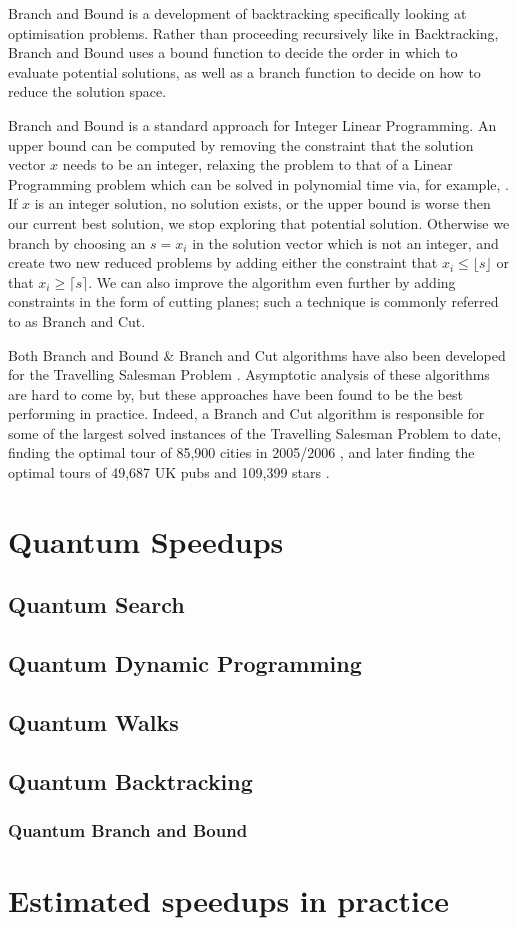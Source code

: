 Branch and Bound is a development of backtracking specifically looking at optimisation problems. Rather than proceeding recursively like in Backtracking, Branch and Bound uses a bound function to decide the order in which to evaluate potential solutions, as well as a branch function to decide on how to reduce the solution space.

Branch and Bound is a standard approach for Integer Linear Programming. An upper bound can be computed by removing the constraint that the solution vector $x$ needs to be an integer, relaxing the problem to that of a Linear Programming problem which can be solved in polynomial time via, for example, \cite{cohen2019}. If $x$ is an integer solution, no solution exists, or the upper bound is worse then our current best solution, we stop exploring that potential solution. Otherwise we branch by choosing an $s = x_i$ in the solution vector which is not an integer, and create two new reduced problems by adding either the constraint that $x_i \leq \lfloor s \rfloor$ or that $x_i \geq \lceil s \rceil$. We can also improve the algorithm even further by adding constraints in the form of cutting planes; such a technique is commonly referred to as Branch and Cut.

Both Branch and Bound \& Branch and Cut algorithms have also been developed for the Travelling Salesman Problem \cite{little1963, padberg1991}. Asymptotic analysis of these algorithms are hard to come by, but these approaches have been found to be the best performing in practice. Indeed, a Branch and Cut algorithm is responsible for some of the largest solved instances of the Travelling Salesman Problem to date, finding the optimal tour of 85,900 cities in 2005/2006 \cite{applegate2006}, and later finding the optimal tours of 49,687 UK pubs and 109,399 stars \cite{tspuk49687}.

\section{Quantum Speedups}

\subsection{Quantum Search}

\subsection{Quantum Dynamic Programming}

\subsection{Quantum Walks}

\subsection{Quantum Backtracking}

\subsubsection{Quantum Branch and Bound}

\section{Estimated speedups in practice}